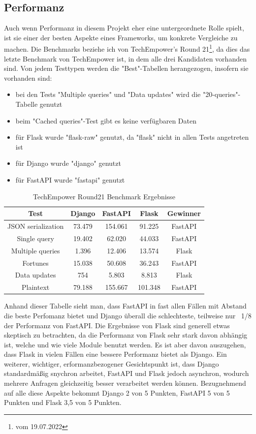 \documentclass[letterpaper,11pt,leqno]{article}
\begin{document}
\subsection{Performanz}
Auch wenn Performanz in diesem Projekt eher eine untergeordnete Rolle spielt, ist sie einer der
besten Aspekte eines Frameworks, um konkrete Vergleiche zu machen. Die Benchmarks beziehe ich von
TechEmpower's Round 21\footnote{vom 19.07.2022}, da dies das letzte Benchmark von TechEmpower ist,
in dem alle drei Kandidaten vorhanden sind. Von jedem Testtypen werden die "Best"-Tabellen
herangezogen, insofern sie vorhanden sind:
\begin{itemize}
	\item bei den Tests "Multiple queries" und "Data updates" wird die "20-queries"-Tabelle genutzt
	\item beim "Cached queries"-Test gibt es keine verfügbaren Daten
	\item für Flask wurde "flask-raw" genutzt, da "flask" nicht in allen Tests angetreten ist
	\item für Django wurde "django" genutzt
	\item für FastAPI wurde "fastapi" genutzt
\end{itemize}
\begin{table}[h!]
	\begin{center}
		\begin{tabular}{|c||c|c|c|c|}
			\hline
			Test & Django & FastAPI & Flask & Gewinner\\
			\hline\hline
			JSON serialization & 73.479 & 154.061 & 91.225 & FastAPI\\
			Single query & 19.402 & 62.020 & 44.033 & FastAPI\\
			Multiple queries & 1.396 & 12.406 & 13.574 & Flask\\
			Fortunes & 15.038 & 50.608 & 36.243 & FastAPI\\
			Data updates & 754 & 5.803 & 8.813 & Flask\\
			Plaintext & 79.188 & 155.667 & 101.348 & FastAPI\\
			\hline
		\end{tabular}
		\caption{TechEmpower Round21 Benchmark Ergebnisse}
	\end{center}
	\label{table:7}
\end{table}

Anhand dieser Tabelle sieht man, dass FastAPI in fast allen Fällen mit Abstand die beste Perfomanz
bietet und Django überall die schlechteste, teilweise nur ~1/8 der Performanz von FastAPI. Die
Ergebnisse von Flask sind generell etwas skeptisch zu betrachten, da die Performanz von Flask sehr
stark davon abhängig ist, welche und wie viele Module benutzt werden. Es ist aber davon auszugehen,
dass Flask in vielen Fällen eine bessere Performanz bietet als Django. Ein weiterer, wichtiger, 
erformanzbezogener Gesichtspunkt ist, dass Django standardmäßig snychron arbeitet, FastAPI und Flask
jedoch asynchron, wodurch mehrere Anfragen gleichzeitig besser verarbeitet werden können.
Bezugnehmend auf alle diese Aspekte bekommt Django 2 von 5 Punkten, FastAPI 5 von 5 Punkten und
Flask 3,5 von 5 Punkten.
\end{document}
